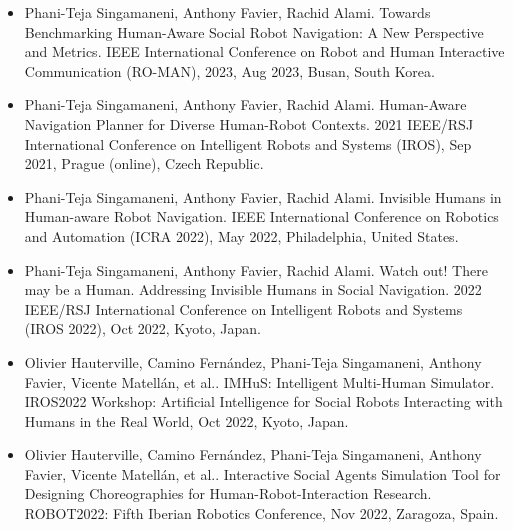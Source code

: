 \begin{itemize}
    \item Phani-Teja Singamaneni, Anthony Favier, Rachid Alami. Towards Benchmarking Human-Aware Social Robot Navigation: A New Perspective and Metrics. IEEE International Conference on Robot and Human Interactive Communication (RO-MAN), 2023, Aug 2023, Busan, South Korea.
    \item Phani-Teja Singamaneni, Anthony Favier, Rachid Alami. Human-Aware Navigation Planner for Diverse Human-Robot Contexts. 2021 IEEE/RSJ International Conference on Intelligent Robots and Systems (IROS), Sep 2021, Prague (online), Czech Republic. 
    \item Phani-Teja Singamaneni, Anthony Favier, Rachid Alami. Invisible Humans in Human-aware Robot Navigation. IEEE International Conference on Robotics and Automation (ICRA 2022), May 2022, Philadelphia, United States.
    \item Phani-Teja Singamaneni, Anthony Favier, Rachid Alami. Watch out! There may be a Human. Addressing Invisible Humans in Social Navigation. 2022 IEEE/RSJ International Conference on Intelligent Robots and Systems (IROS 2022), Oct 2022, Kyoto, Japan. 

    \item Olivier Hauterville, Camino Fernández, Phani-Teja Singamaneni, Anthony Favier, Vicente Matellán, et al.. IMHuS: Intelligent Multi-Human Simulator. IROS2022 Workshop: Artificial Intelligence for Social Robots Interacting with Humans in the Real World, Oct 2022, Kyoto, Japan. 
    \item Olivier Hauterville, Camino Fernández, Phani-Teja Singamaneni, Anthony Favier, Vicente Matellán, et al.. Interactive Social Agents Simulation Tool for Designing Choreographies for Human-Robot-Interaction Research. ROBOT2022: Fifth Iberian Robotics Conference, Nov 2022, Zaragoza, Spain. 
\end{itemize}
    
    
    
    
    